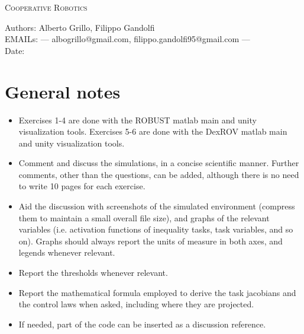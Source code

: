 \documentclass{article}
\makeatletter
\newcommand\frontmatter{%
    \cleardoublepage
  \pagenumbering{roman}}
\newcommand\mainmatter{%
    \cleardoublepage
  \pagenumbering{arabic}}
\makeatother
\begin{document}
\frontmatter
\onecolumn 
\vskip 1cm
\begin{center}
\huge \textsc{Cooperative Robotics}\\
\vskip 1cm

\skip 0.5cm

\vskip 5cm

\normalsize
Authors: Alberto Grillo, Filippo Gandolfi\\
EMAILs: --- albogrillo@gmail.com, filippo.gandolfi95@gmail.com ---\\
Date:  \\
\end{center}
\clearpage
\mainmatter
\section*{General notes}

\begin{itemize}
	\item Exercises 1-4 are done with the ROBUST matlab main and unity visualization tools. Exercises 5-6 are done with the DexROV matlab main and unity visualization tools.
	\item Comment and discuss the simulations, in a concise scientific manner. Further comments, other than the questions, can be added, although there is no need to write 10 pages for each exercise.
	\item Aid the discussion with screenshots of the simulated environment (compress them to maintain a small overall file size), and graphs of the relevant variables (i.e. activation functions of inequality tasks, task variables, and so on). Graphs should always report the units of measure in both axes, and legends whenever relevant.
	\item Report the thresholds whenever relevant.
	\item Report the mathematical formula employed to derive the task jacobians and the control laws when asked, including where they are projected.
	\item If needed, part of the code can be inserted as a discussion reference.
\end{itemize} 

\clearpage
\end{document}
